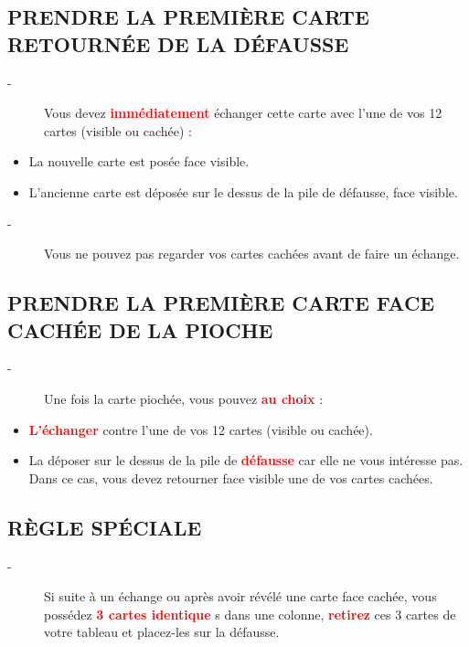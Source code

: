 \documentclass{article}%
\begin{document}
%
\subsection{ PRENDRE LA PREMIÈRE CARTE RETOURNÉE DE LA DÉFAUSSE
}%
\label{subsec:PRENDRELAPREMIRECARTERETOURNEDELADFAUSSE}%
\begin{description}%
\item[{-} ]%
%
 Vous devez %
\textcolor{red}{%
\textbf{immédiatement}%
}%
\textit{ }%
 échanger cette carte avec l’une de vos 12 cartes (visible ou cachée) :
%
\end{description}%
\begin{itemize}%
\item%
%
 La nouvelle carte est posée face visible.
%
\item%
%
 L'ancienne carte est déposée sur le dessus de la pile de défausse, face visible.
%
\end{itemize}%
\begin{description}%
\item[{-} ]%
%
 Vous ne pouvez pas regarder vos cartes cachées avant de faire un échange.
%
\end{description}

%
\subsection{ PRENDRE LA PREMIÈRE CARTE FACE CACHÉE DE LA PIOCHE
}%
\label{subsec:PRENDRELAPREMIRECARTEFACECACHEDELAPIOCHE}%
\begin{description}%
\item[{-} ]%
%
 Une fois la carte piochée, vous pouvez %
\textcolor{red}{%
\textbf{au choix}%
}%
\textit{ }%
 :
%
\end{description}%
\begin{itemize}%
\item%
%
\textcolor{red}{%
\textbf{L'échanger}%
}%
\textit{ }%
 contre l'une de vos 12 cartes (visible ou cachée).
%
\item%
%
 La déposer sur le dessus de la pile de %
\textcolor{red}{%
\textbf{défausse}%
}%
\textit{ }%
 car elle ne vous intéresse pas. Dans ce cas, vous devez retourner face visible une de vos cartes cachées.
%
\end{itemize}

%
\subsection{ RÈGLE SPÉCIALE
}%
\label{subsec:RGLESPCIALE}%
\begin{description}%
\item[{-} ]%
%
 Si suite à un échange ou après avoir révélé une carte face cachée, vous possédez %
\textcolor{red}{%
\textbf{3 cartes identique}%
}%
s dans une colonne, %
\textcolor{red}{%
\textbf{retirez}%
}%
\textit{ }%
 ces 3 cartes de votre tableau et placez{-}les sur la défausse.
%
\end{description}
\end{document}
